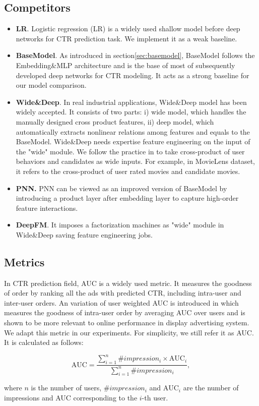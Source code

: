 \subsection{Competitors}
\label{competitors}
\begin{itemize}
\item \textbf{LR\cite{ftrl}}. Logistic regression (LR) is a widely used shallow model before deep networks for CTR prediction task. We implement it as a weak baseline.       
\item \textbf{BaseModel}. As introduced in section\ref{sec:basemodel}, BaseModel follows the Embedding\&MLP architecture and is the base of most of subsequently developed deep networks for CTR modeling. It acts as a strong baseline for our model comparison.   
\item \textbf{Wide\&Deep\cite{widedeep}}. 
In real industrial applications, Wide\&Deep model has been widely accepted. 
It consists of two parts: i) wide model, which handles the manually designed cross product features, ii) deep model, which automatically extracts nonlinear relations among features and equals to the BaseModel. 
Wide\&Deep needs expertise feature engineering on the input of the "wide" module. 
We follow the practice in \cite{DeepFM} to take cross-product of user behaviors and candidates as wide inputs.
For example, in MovieLens dataset, it refers to the cross-product of user rated movies and candidate movies. 
\item \textbf{PNN\cite{PNN}.} PNN can be viewed as an improved version of BaseModel by introducing a product layer after embedding layer to capture high-order feature interactions. 
\item \textbf{DeepFM\cite{DeepFM}}. It imposes a factorization machines as "wide" module in Wide\&Deep saving feature engineering jobs. 
\end{itemize}
\subsection{Metrics}
\label{metric}
In CTR prediction field, AUC is a widely used metric\cite{fawcett:roc}. 
It measures the goodness of order by ranking all the ads with predicted CTR, including intra-user and inter-user orders. 
An variation of user weighted AUC is introduced in \cite{Amazon:AUC,zhu2017optimized} which measures the goodness of intra-user order by averaging AUC over users and is shown to be more relevant to online performance in display advertising system. 
We adapt this metric in our experiments. For simplicity, we still refer it as AUC. 
It is calculated as follows:
\begin{small}
\begin{equation} \label{imps-guac}
\text{AUC} = \frac{\sum_{i=1}^{n} \#impression_i \times \text{AUC}_{i}}{\sum_{i=1}^{n} \#impression_i},
\end{equation}
\end{small}
where $n$ is the number of users, $\#impression_i$ and $\text{AUC}_i$ are the number of impressions and AUC corresponding to the $i$-th user. 

